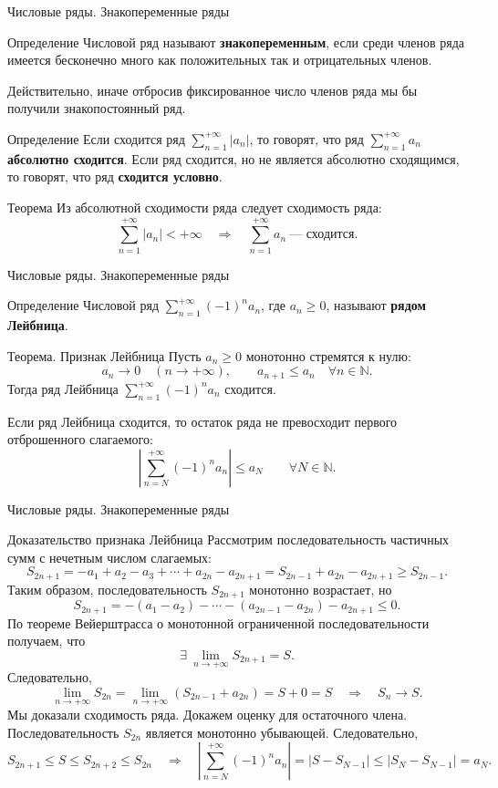 \documentclass[8pt]{beamer}
\begin{document}
\begin{frame}{Числовые ряды. Знакопеременные ряды}
\begin{block}{Определение}
Числовой ряд называют {\bf знакопеременным}, если среди членов ряда имеется бесконечно много как положительных так и отрицательных членов. 
\end{block}
Действительно, иначе отбросив фиксированное число членов ряда мы бы получили знакопостоянный ряд.
\begin{block}{Определение}
Если сходится ряд $\displaystyle \sum_{n=1}^{+\infty}|a_n|$, то говорят, что ряд $\displaystyle \sum_{n=1}^{+\infty}a_n$ {\bf абсолютно сходится}. Если ряд сходится, но не является абсолютно сходящимся, то говорят, что ряд {\bf сходится условно}.
\end{block}
\begin{block}{Теорема}
Из абсолютной сходимости ряда следует сходимость ряда:
$$\sum_{n=1}^{+\infty}|a_n|<+\infty \quad \Rightarrow \quad \sum_{n=1}^{+\infty}a_n \ \text{--- сходится.}
$$
\end{block}
\end{frame}

\begin{frame}{Числовые ряды. Знакопеременные ряды}
\begin{block}{Определение}
Числовой ряд $\displaystyle \sum_{n=1}^{+\infty}(-1)^n a_n$, где $a_n\ge 0$, называют {\bf рядом Лейбница}. 
\end{block}
\begin{block}{Теорема. Признак Лейбница}
Пусть $a_n\ge 0$ монотонно стремятся к нулю:
$$a_n\to 0\quad (n\to+\infty),\qquad  a_{n+1}\le a_n \quad \forall n\in\mathbb{N}.$$
Тогда ряд Лейбница $\displaystyle \sum_{n=1}^{+\infty}(-1)^n a_n$ сходится.

Если ряд Лейбница сходится, то остаток ряда не превосходит первого отброшенного слагаемого:
$$\left| \sum_{n=N}^{+\infty}(-1)^n a_n \right| \le a_N \qquad \forall N\in\mathbb{N}.$$
\end{block}
\end{frame}

\begin{frame}{Числовые ряды. Знакопеременные ряды}
\begin{block}{Доказательство признака Лейбница}
Рассмотрим последовательность частичных сумм с нечетным числом слагаемых:
$$S_{2n+1} = -a_1+a_2-a_3+\cdots+a_{2n}-a_{2n+1} = S_{2n-1}+a_{2n}-a_{2n+1}\ge S_{2n-1}.$$
Таким образом, последовательность $S_{2n+1}$ монотонно возрастает, но
$$S_{2n+1} =-(a_1-a_2)-\cdots - (a_{2n-1}-a_{2n})-a_{2n+1} \le 0.$$
По теореме Вейерштрасса о монотонной ограниченной последовательности получаем, что
$$\exists\ \lim_{n\to+\infty}S_{2n+1} = S.$$
Следовательно,
$$\lim_{n\to+\infty}S_{2n} =\lim_{n\to+\infty}( S_{2n-1}+a_{2n}) = S+0 = S\quad \Rightarrow \quad S_{n}\to S.
$$
Мы доказали сходимость ряда. Докажем оценку для остаточного члена.
Последовательность $S_{2n}$ является монотонно убывающей. Следовательно,
$$S_{2n+1}\le S \le S_{2n+2}\le S_{2n} \quad \Rightarrow\quad
\left| \sum_{n=N}^{+\infty}(-1)^n a_n \right| = \left| S-S_{N-1} \right| \le \left| S_{N}-S_{N-1} \right|=a_N.$$
\end{block}
\end{frame}
\end{document}
